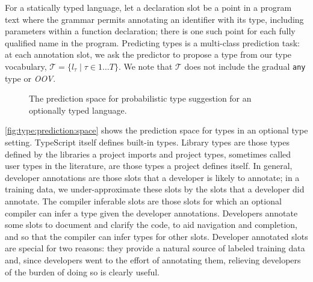 \documentclass[acmsmall, review, anonymous]{acmart}\settopmatter{printfolios=true,printccs=false,printacmref=false}
\begin{document}

For a statically typed language, let a declaration slot be a point in a program text where the grammar permits annotating an identifier with its type, including parameters within a function declaration; there is one such point for each fully qualified name in the program.  Predicting types is a multi-class prediction task: at each annotation slot, we ask the predictor to propose a type from our type vocabulary, $\mathcal{T} = \{ l_\tau \mid \tau \in 1 \dots T \}$. We note that $\mathcal{T}$ does not include the gradual \texttt{any} type or \textit{OOV}.

\begin{figure*}[t]
    \centering
    \def\svgwidth{0.8\linewidth}
    
    \caption{The prediction space for probabilistic type suggestion for an optionally typed language.}
    \label{fig:type:prediction:space}
\end{figure*}

\autoref{fig:type:prediction:space} shows the prediction space for types in an optional type setting.
TypeScript itself defines built-in types.  Library types are those types defined by the libraries a project imports and project types, sometimes called user types in the literature, are those types a project defines itself. 
In general, developer annotations are those slots that a developer is likely to annotate; in a training data, we under-approximate these slots by the slots that a developer did annotate. 
The compiler inferable slots are those slots for which an optional compiler can infer a type given the developer annotations.  
Developers annotate some slots to document and clarify the code, to aid navigation and completion, and so that the compiler can infer types for other slots.  
Developer annotated slots are special for two reasons:  they provide a natural source of labeled training data and, since developers went to the effort of annotating them, relieving developers of the burden of doing so is clearly useful.
\end{document}
